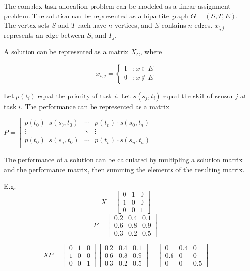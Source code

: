 \documentclass[a4paper]{article}
\begin{document}
The complex task allocation problem can be modeled as a linear assignment problem.  The solution can be represented as a bipartite graph $G=(S,T,E)$.  The vertex sets $S$ and $T$ each have $n$ vertices, and $E$ contains $n$ edges. $x_{i,j}$ represents an edge between $S_i$ and $T_j$. 

A solution can be represented as a matrix $X_G$, where 

$$x_{i,j} = \left\{
     \begin{array}{lr}
       1 & : x \in E\\
       0 & : x \notin E
     \end{array}
   \right.$$

Let $p(t_i)$ equal the priority of task $i$.
Let $s(s_j, t_i)$ equal the skill of sensor $j$ at task $i$. The performance can be represented as a matrix

$P = \begin{bmatrix}
p(t_0) \cdot s(s_0, t_0) & \cdots & p(t_n) \cdot s(s_0, t_n) \\
\vdots & \ddots & \vdots \\
p(t_0) \cdot s(s_n, t_0) & \cdots & p(t_n) \cdot s(s_n, t_n) \\
\end{bmatrix}$

The performance of a solution can be calculated by multipling a solution matrix and the performance matrix, then summing the elements of the resulting matrix.

E.g.
$$X = \begin{bmatrix}
0 & 1 & 0 \\
1 & 0 & 0 \\
0 & 0 & 1
\end{bmatrix}$$
$$P = \begin{bmatrix}
0.2 & 0.4 & 0.1 \\
0.6 & 0.8 & 0.9 \\
0.3 & 0.2 & 0.5
\end{bmatrix}$$

$$XP = 
\begin{bmatrix}
0 & 1 & 0 \\
1 & 0 & 0 \\
0 & 0 & 1
\end{bmatrix}
\begin{bmatrix}
0.2 & 0.4 & 0.1 \\
0.6 & 0.8 & 0.9 \\
0.3 & 0.2 & 0.5
\end{bmatrix} = 
\begin{bmatrix}
0 & 0.4 & 0 \\
0.6 & 0 & 0 \\
0 & 0 & 0.5
\end{bmatrix}$$
\end{document}

